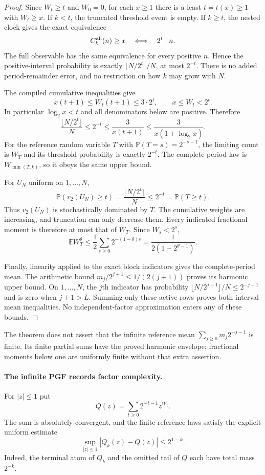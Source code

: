 \documentclass[11pt]{article}
\theoremstyle{definition}
\begin{document}
\begin{proof}
Since $W_t\ge t$ and $W_0=0$, for each $x\ge1$ there is a
least $t=t(x)\ge1$ with $W_t\ge x$.
If $k<t$, the truncated threshold event is empty.
If $k\ge t$, the nested clock gives the exact equivalence
\[
 C_k^{\rm all}(n)\ge x
 \quad\Longleftrightarrow\quad2^t\mid n.
\]
The full observable has the same equivalence for every positive
$n$. Hence the positive-interval probability is exactly
$\lfloor N/2^t\rfloor/N$, at most $2^{-t}$.
There is no added period-remainder error, and no restriction
on how $k$ may grow with $N$.

The compiled cumulative inequalities give
\[
 x(t+1)\le W_t(t+1)\le3\cdot2^t,\qquad x\le W_t<2^t.
\]
In particular $\log_2 x<t$ and all denominators below are
positive. Therefore
\[
 \frac{\lfloor N/2^t\rfloor}{N}
 \le2^{-t}\le\frac{3}{x(t+1)}
 \le\frac{3}{x(1+\log_2 x)}.
\]
For the reference random variable $T$ with
$\mathbb P(T=s)=2^{-s-1}$, the limiting count is $W_T$ and
its threshold probability is exactly $2^{-t}$.
The complete-period law is $W_{\min(T,k)}$, so it obeys
the same upper bound.

For $U_N$ uniform on $1,\ldots,N$,
\[
 \mathbb P(v_2(U_N)\ge t)
 =\frac{\lfloor N/2^t\rfloor}{N}\le2^{-t}
 =\mathbb P(T\ge t).
\]
Thus $v_2(U_N)$ is stochastically dominated by $T$.
The cumulative weights are increasing, and truncation can
only decrease them. Every indicated fractional moment is
therefore at most that of $W_T$.
Since $W_s<2^s$,
\[
 \mathbb E W_T^\theta
 \le\frac12\sum_{s\ge0}2^{-(1-\theta)s}
 =\frac{1}{2(1-2^{\theta-1})}.
\]

Finally, linearity applied to the exact block indicators gives
the complete-period mean. The arithmetic bound
$m_j/2^{j+1}\le1/(2(j+1))$ proves its harmonic upper bound.
On $1,\ldots,N$, the $j$th indicator has probability
$\lfloor N/2^{j+1}\rfloor/N\le2^{-j-1}$ and is zero when
$j+1>L$. Summing only these active rows proves both interval
mean inequalities. No independent-factor approximation enters
any of these bounds.
\end{proof}

The theorem does not assert that the infinite reference mean
$\sum_{j\ge0}m_j2^{-j-1}$ is finite. Its finite partial sums
have the proved harmonic envelope; fractional moments below
one are uniformly finite without that extra assertion.

\paragraph{The infinite PGF records factor complexity.}
For $|z|\le1$ put
\[
 Q(z)=\sum_{t\ge0}2^{-t-1}z^{W_t}.
\]
The sum is absolutely convergent, and the finite reference
laws satisfy the explicit uniform estimate
\[
 \sup_{|z|\le1}|Q_k(z)-Q(z)|\le2^{1-k}.
\]
Indeed, the terminal atom of $Q_k$ and the omitted tail of
$Q$ each have total mass $2^{-k}$.
\end{document}
